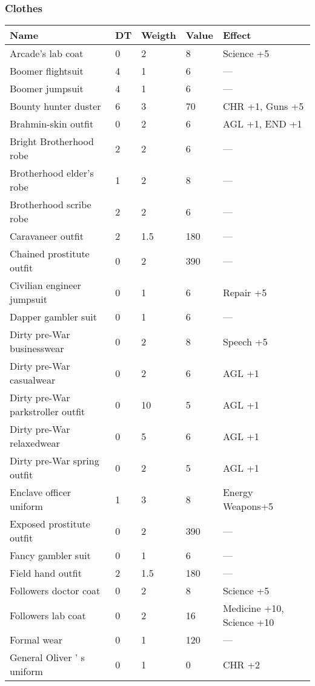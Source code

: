 
\subsubsection{Clothes}
\begin{longtable}{|p{4cm}|p{1.2cm}|p{1.2cm}|p{1.2cm}|p{4cm}|}
\hline
\bfseries Name & \bfseries DT & \bfseries Weigth & \bfseries Value & \bfseries Effect \\
\hline
\endhead
Arcade's lab coat  & 0 & 2 & 8 & Science +5  \\
Boomer flightsuit  & 4 & 1 & 6 & —  \\
Boomer jumpsuit  & 4 & 1 & 6 & —  \\
Bounty hunter duster  & 6 & 3 & 70 & CHR +1, Guns +5  \\
Brahmin-skin outfit  & 0 & 2 & 6 & AGL +1, END +1  \\
Bright Brotherhood robe  & 2 & 2 & 6 & —  \\
Brotherhood elder's robe  & 1 & 2 & 8 & —  \\
Brotherhood scribe robe  & 2 & 2 & 6 & —  \\
Caravaneer outfit  & 2 & 1.5  & 180 & —  \\
Chained prostitute outfit  & 0 & 2 & 390 & —  \\
Civilian engineer jumpsuit  & 0 & 1 & 6 & Repair +5  \\
Dapper gambler suit  & 0 & 1 & 6 & —  \\
Dirty pre-War businesswear  & 0 & 2 & 8 & Speech +5  \\
Dirty pre-War casualwear  & 0 & 2 & 6 & AGL +1  \\
Dirty pre-War parkstroller outfit  & 0 & 10 & 5 & AGL +1  \\
Dirty pre-War relaxedwear  & 0 & 5 & 6 & AGL +1  \\
Dirty pre-War spring outfit  & 0 & 2 & 5 & AGL +1  \\
Enclave officer uniform  & 1 & 3 & 8 & Energy Weapons+5  \\
Exposed prostitute outfit  & 0 & 2 & 390 & —  \\
Fancy gambler suit  & 0 & 1 & 6 & —  \\
Field hand outfit  & 2 & 1.5  & 180 & —  \\
Followers doctor coat  & 0 & 2 & 8 & Science +5  \\
Followers lab coat  & 0 & 2 & 16 & Medicine +10, Science +10  \\
Formal wear  & 0 & 1 & 120 & —  \\
General Oliver ' s uniform  & 0 & 1 & 0 & CHR +2 \\

\end{longtable}
